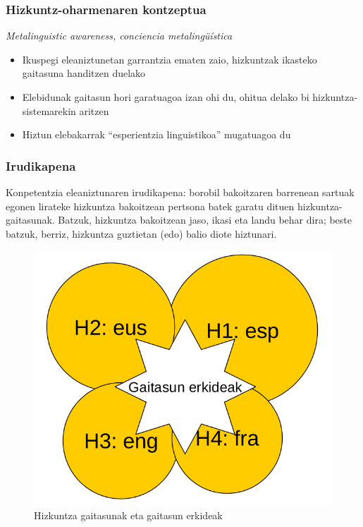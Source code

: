 \documentclass[
]{book}
\providecommand{\tightlist}{%
  \setlength{\itemsep}{0pt}\setlength{\parskip}{0pt}}
\begin{document}
\hypertarget{hizkuntz-oharmenaren-kontzeptua}{%
\subsubsection{Hizkuntz-oharmenaren kontzeptua}\label{hizkuntz-oharmenaren-kontzeptua}}

\emph{Metalinguistic awareness, conciencia metalingüística}

\begin{itemize}
\tightlist
\item
  Ikuspegi eleaniztunetan garrantzia ematen zaio, hizkuntzak ikasteko gaitasuna handitzen duelako
\item
  Elebidunak gaitasun hori garatuagoa izan ohi du, ohitua delako bi hizkuntza-sistemarekin aritzen
\item
  Hiztun elebakarrak ``esperientzia linguistikoa'' mugatuagoa du
\end{itemize}

\hypertarget{irudikapena}{%
\subsubsection{Irudikapena}\label{irudikapena}}

Konpetentzia eleaniztunaren irudikapena: borobil bakoitzaren barrenean sartuak egonen lirateke hizkuntza bakoitzean pertsona batek garatu dituen hizkuntza-gaitasunak. Batzuk, hizkuntza bakoitzean jaso, ikasi eta landu behar dira; beste batzuk, berriz, hizkuntza guztietan (edo) balio diote hiztunari.

\begin{figure}
\centering
\includegraphics{assets/2-gaitasunerkideak.png}
\caption{Hizkuntza gaitasunak eta gaitasun erkideak}
\end{figure}
\end{document}
